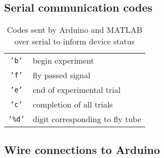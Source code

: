 \documentclass[12pt]{article}
\begin{document}
\subsection{Serial communication codes}
\begin{table}[H]
	\centering
	\begin{tabular}{c l}
		\texttt{'b'}  & begin experiment\\
	    \texttt{'f'}  & fly passed signal\\
		\texttt{'e'}  & end of experimental trial\\
		\texttt{'c'}  & completion of all trials\\				
		\texttt{'\%d'} & digit corresponding to fly tube\\
	\end{tabular}
	\caption{Codes sent by Arduino and MATLAB over serial to inform device status}
	\label{tbl:arduino_codes}
\end{table}

\subsection{Wire connections to Arduino}
\end{document}
